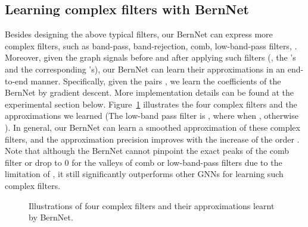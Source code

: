 \documentclass{article}
\begin{document}
\begin{table}[t]
\caption{Realizing commonly used filters with BernNet.}\label{tab:filters}
\end{table}


\subsection{Learning complex filters with BernNet}
\label{le:comp_filter}
Besides designing the above typical filters, our BernNet can express more complex filters, such as band-pass, band-rejection, comb, low-band-pass filters, .
Moreover, given the graph signals before and after applying such filters (, the 's and the corresponding 's), our BernNet can learn their approximations in an end-to-end manner. 
Specifically, given the pairs , we learn the coefficients  of the BernNet by gradient descent. 
More implementation details can be found at the experimental section below. 
Figure~\ref{fig:filters_bern} illustrates the four complex filters and the approximations we learned (The low-band pass filter is , where  when , otherwise ).
In general, our BernNet can learn a smoothed approximation of these complex filters, and the approximation precision improves with the increase of the order . 
Note that although the BernNet cannot pinpoint the exact peaks of the comb filter or drop to 0 for the valleys of comb or low-band-pass filters due to the limitation of , it still significantly outperforms other GNNs for learning such complex filters.






\begin{figure}[t]
    \centering
   \hspace{-2mm}
   \hspace{-2mm}
   \hspace{-2mm}
   \vspace{-3mm}
    \caption{Illustrations of four complex filters and their approximations learnt by BernNet.}
    \label{fig:filters_bern}
\end{figure}
\end{document}
